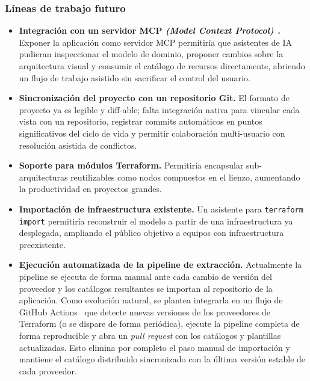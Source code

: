 \documentclass{article}
\begin{document}
{        \subsubsection*{Líneas de trabajo futuro}
        \begin{itemize}[leftmargin=*, itemsep=2pt]
            \item \textbf{Integración con un servidor MCP \textit{(Model
            Context Protocol)}}~\cite{noauthor_what_nodate}\textbf{.} Exponer la aplicación como servidor MCP
            permitiría que asistentes de IA pudieran inspeccionar el modelo
            de dominio, proponer cambios sobre la arquitectura visual y
            consumir el catálogo de recursos directamente, abriendo un flujo
            de trabajo asistido sin sacrificar el control del usuario.
            \item \textbf{Sincronización del proyecto con un repositorio
            Git.} El formato de proyecto ya es legible y diff-able; falta
            integración nativa para vincular cada vista con un repositorio,
            registrar commits automáticos en puntos significativos del ciclo
            de vida y permitir colaboración multi-usuario con resolución
            asistida de conflictos.
            \item \textbf{Soporte para módulos Terraform.} Permitiría
            encapsular sub-arquitecturas reutilizables como nodos compuestos
            en el lienzo, aumentando la productividad en proyectos grandes.
            \item \textbf{Importación de infraestructura existente.} Un
            asistente para \texttt{terraform import} permitiría reconstruir
            el modelo a partir de una infraestructura ya desplegada,
            ampliando el público objetivo a equipos con infraestructura
            preexistente.
            \item \textbf{Ejecución automatizada de la pipeline de
            extracción.} Actualmente la pipeline se ejecuta de forma manual
            ante cada cambio de versión del proveedor y los catálogos
            resultantes se importan al repositorio de la aplicación. Como
            evolución natural, se plantea integrarla en un flujo de
            GitHub Actions~\cite{noauthor_descripcion_nodate-1} que detecte nuevas versiones de los proveedores
            de Terraform (o se dispare de forma periódica), ejecute la
            pipeline completa de forma reproducible y abra un \textit{pull
            request} con los catálogos y plantillas actualizadas. Esto
            elimina por completo el paso manual de importación y mantiene
            el catálogo distribuido sincronizado con la última versión
            estable de cada proveedor.
        \end{itemize}

}
\end{document}

